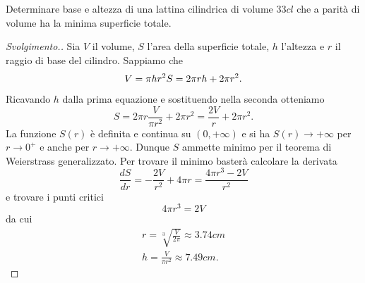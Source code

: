 \begin{exercise}
Determinare base e altezza di una lattina cilindrica di volume $33 cl$
che a parità di volume ha la minima superficie totale.
\end{exercise}
\begin{proof}[Svolgimento.]
Sia $V$ il volume, $S$ l'area della superficie totale, $h$ l'altezza e $r$
il raggio di base del cilindro.
Sappiamo che
\[
  V = \pi h r^2 \\
  S = 2\pi r h + 2 \pi r^2.
\]
Ricavando $h$ dalla prima equazione e sostituendo nella seconda otteniamo
\[
  S = 2 \pi r \frac{V}{\pi r^2} + 2 \pi r^2
    = \frac{2V}{r} + 2 \pi r^2.
\]
La funzione $S(r)$ è definita e continua su $(0,+\infty)$
e si ha $S(r)\to +\infty$ per $r\to 0^+$
e anche per $r\to +\infty$. Dunque $S$ ammette minimo per il teorema di Weierstrass
generalizzato.
Per trovare il minimo basterà calcolare la derivata
\[
 \frac{dS}{dr} = -\frac{2V}{r^2} + 4 \pi r = \frac{4\pi r^3 - 2V}{r^2}
\]
e trovare i punti critici
\[
  4\pi r^3 = 2V
\]
da cui
\begin{align*}
 r = \sqrt[3]{\frac{V}{2\pi}} \approx 3.74 cm\\
 h = \frac{V}{\pi r^2} \approx 7.49 cm.
\end{align*}
\end{proof}

